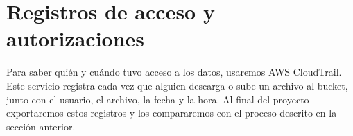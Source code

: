 \section{Registros de acceso y autorizaciones}

Para saber quién y cuándo tuvo acceso a los datos, usaremos AWS CloudTrail. Este servicio registra cada vez que alguien descarga o sube un archivo al bucket, junto con el usuario, el archivo, la fecha y la hora. Al final del proyecto exportaremos estos registros y los compararemos con el proceso descrito en la sección anterior.
